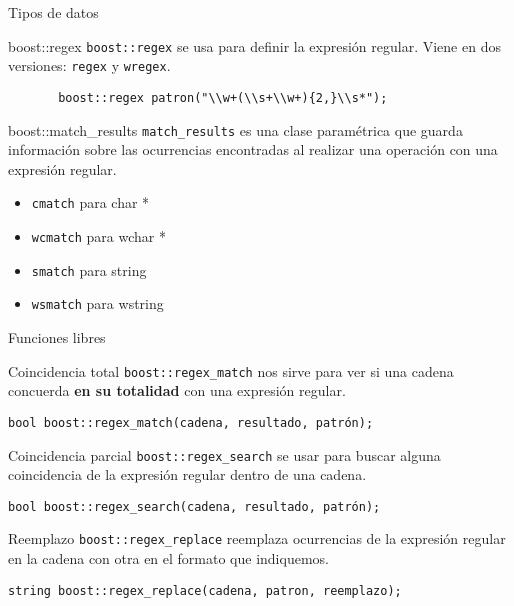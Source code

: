 \documentclass[8pt,xcolor=svgnames]{beamer}
\begin{document}
\begin{frame}[fragile]{Tipos de datos}
  \begin{block}{boost::regex}
    \texttt{boost::regex} se usa para definir la expresión
    regular. Viene en dos versiones: \texttt{regex} y \texttt{wregex}.
\begin{verbatim}
       boost::regex patron("\\w+(\\s+\\w+){2,}\\s*");
\end{verbatim}
  \end{block}

  \pause

  \begin{block}{boost::match\_results}
    \texttt{match\_results} es una clase paramétrica que guarda
    información sobre las ocurrencias encontradas al realizar una
    operación con una expresión regular.
    
    \begin{itemize}
    \item \texttt{cmatch} para char *
    \item \texttt{wcmatch} para wchar *
    \item \texttt{smatch} para string
    \item \texttt{wsmatch} para wstring
    \end{itemize}
  \end{block}
\end{frame}

\begin{frame}[fragile]{Funciones libres}
  \begin{block}{Coincidencia total}
    \texttt{boost::regex\_match} nos sirve para ver si una cadena
    concuerda \textbf{en su totalidad} con una expresión regular.
\begin{verbatim}
bool boost::regex_match(cadena, resultado, patrón);
\end{verbatim}
  \end{block}

  \pause
  \begin{block}{Coincidencia parcial}
    \texttt{boost::regex\_search} se usar para buscar alguna
    coincidencia de la expresión regular dentro de una cadena.
\begin{verbatim}
bool boost::regex_search(cadena, resultado, patrón);
\end{verbatim}
  \end{block}
  
  \pause
  \begin{block}{Reemplazo}
    \texttt{boost::regex\_replace} reemplaza ocurrencias de la
    expresión regular en la cadena con otra en el formato que
    indiquemos.
    
\begin{verbatim}
string boost::regex_replace(cadena, patron, reemplazo);      
\end{verbatim}

  \end{block}

\end{frame}
\end{document}

